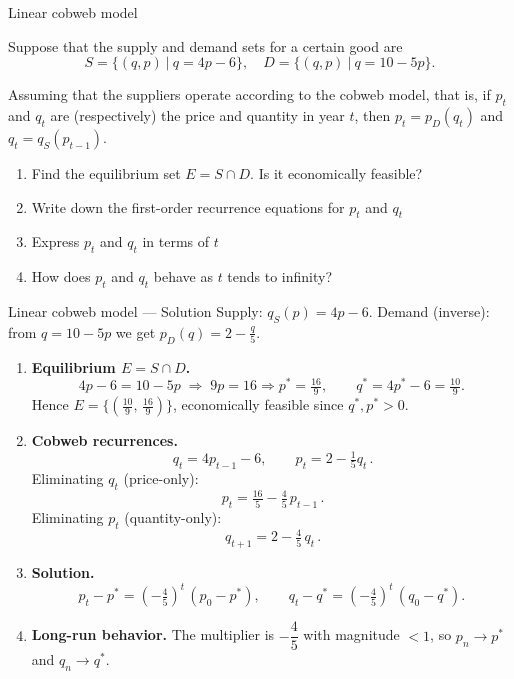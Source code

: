 \documentclass[9pt]{beamer}
\begin{document}
\begin{frame}{Linear cobweb model} 

    Suppose that the supply and demand sets for a certain good are
    $$
    S = \{(q, p)\ |\ q = 4p - 6\}, \quad D = \{(q, p)\ |\ q = 10 - 5p\}.
    $$
    
    Assuming that the suppliers operate according to the cobweb model, that is, if $p_t$ and $q_t$ are (respectively) the price and quantity in year $t$, then $p_t = p_D(q_t)$ and $q_t = q_S(p_{t-1})$. 

    \begin{enumerate}[leftmargin = 0.5cm, label = (\alph*), rightmargin = 0.2cm]
    
        \item Find the equilibrium set $E = S \cap D$. Is it economically feasible?

        \item Write down the first-order recurrence equations for $p_t$ and $q_t$

        \item Express $p_t$ and $q_t$ in terms of $t$
    
        \item How does $p_t$ and $q_t$ behave as $t$ tends to infinity?
    
    \end{enumerate}
    
\end{frame}

\begin{frame}{Linear cobweb model — Solution}
\footnotesize
Supply: $q_S(p)=4p-6$. \; Demand (inverse): from $q=10-5p$ we get $p_D(q)=2-\tfrac{q}{5}$.

\begin{enumerate}[leftmargin=0.5cm, label=(\alph*), rightmargin=0.2cm]
  \item \textbf{Equilibrium $E=S\cap D$.}
  \[
    4p-6=10-5p \;\Rightarrow\; 9p=16 \Rightarrow p^*=\tfrac{16}{9},\qquad
    q^*=4p^*-6=\tfrac{10}{9}.
  \]
  Hence $\boxed{E=\{(\tfrac{10}{9},\,\tfrac{16}{9})\}}$, economically feasible since $q^*,p^*>0$.

  \item \textbf{Cobweb recurrences.}
  \[
    \boxed{\,q_t=4p_{t-1}-6,\qquad p_t=2-\tfrac{1}{5}q_t\,}.
  \]
  Eliminating $q_t$ (price-only):
  \[
    \boxed{\,p_t=\tfrac{16}{5}-\tfrac{4}{5}\,p_{t-1}\,}.
  \]
  Eliminating $p_t$ (quantity-only):
  \[
    \boxed{\,q_{t+1}=2-\tfrac{4}{5}\,q_t\,}.
  \]

  \item \textbf{Solution.}
  \[
    p_t-p^*=(-\tfrac45)^t\,(p_0-p^*),\qquad
    q_t-q^*=(-\tfrac45)^t\,(q_0-q^*).
  \]

  \item \textbf{Long-run behavior.}
  The multiplier is $-\dfrac{4}{5}$ with magnitude $<1$, so $p_n\to p^*$ and $q_n\to q^*$.
\end{enumerate}
\end{frame}
\end{document}
